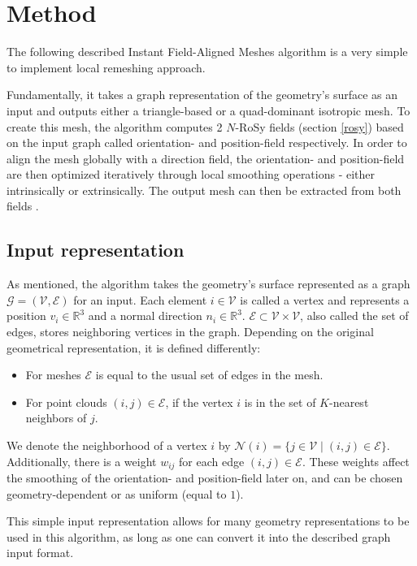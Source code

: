 \documentclass{ACGSeminar}
\begin{document}
\section{Method}\label{algorithm}
The following described Instant Field-Aligned Meshes algorithm is a very simple to implement local remeshing approach.

Fundamentally, it takes a graph representation of the geometry's surface as an input and outputs either a triangle-based or a quad-dominant isotropic mesh. To create this mesh, the algorithm computes 2 $N$-RoSy fields (section \ref{rosy}) based on the input graph called orientation- and position-field respectively. In order to align the mesh globally with a direction field, the orientation- and position-field are then optimized iteratively through local smoothing operations - either intrinsically or extrinsically. The output mesh can then be extracted from both fields \cite{jakob2015instant}.

\subsection{Input representation}
As mentioned, the algorithm takes the geometry's surface represented as a graph $\mathcal{G} = (\mathcal{V}, \mathcal{E})$ for an input. Each element $i \in \mathcal{V}$ is called a vertex and represents a position $v_i \in \mathbb{R}^3$ and a normal direction $n_i \in \mathbb{R}^3$. $\mathcal{E} \subset \mathcal{V} \times \mathcal{V}$, also called the set of edges, stores neighboring vertices in the graph. Depending on the original geometrical representation, it is defined differently:
\begin{itemize}
	\item	For meshes $\mathcal{E}$ is equal to the usual set of edges in the mesh.
	\item	For point clouds $(i,j) \in \mathcal{E}$, if the vertex $i$ is in the set of $K$-nearest neighbors of $j$.
\end{itemize}
We denote the neighborhood of a vertex $i$ by $\mathcal{N}(i) = \{j \in \mathcal{V} \mid (i,j) \in \mathcal{E}\}$. Additionally, there is a weight $w_{ij}$ for each edge $(i,j) \in \mathcal{E}$. These weights affect the smoothing of the orientation- and position-field later on, and can be chosen geometry-dependent or as uniform (equal to $1$).\bigskip

This simple input representation allows for many geometry representations to be used in this algorithm, as long as one can convert it into the described graph input format.
\end{document}
